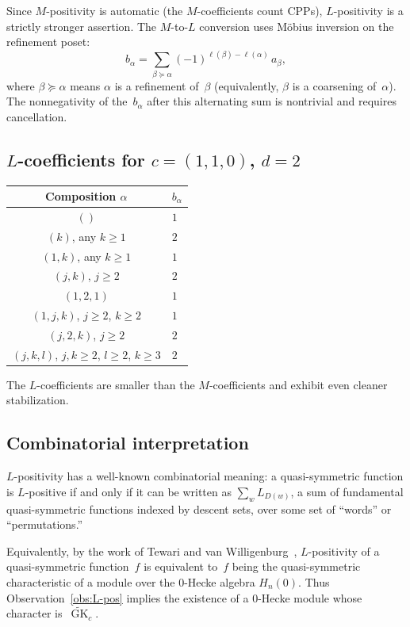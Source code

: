 \documentclass[11pt]{article}
\newcommand{\GK}{\operatorname{GK}}
\begin{document}
Since $M$-positivity is automatic (the $M$-coefficients count
CPPs), $L$-positivity is a strictly stronger assertion.
The $M$-to-$L$ conversion uses M\"obius inversion on the
refinement poset:
\[
  b_\alpha = \sum_{\beta \succeq \alpha}
  (-1)^{\ell(\beta) - \ell(\alpha)}\, a_\beta,
\]
where $\beta \succeq \alpha$ means $\alpha$ is a refinement of~$\beta$
(equivalently, $\beta$ is a coarsening of~$\alpha$).
The nonnegativity of the~$b_\alpha$ after this alternating sum is
nontrivial and requires cancellation.

\subsection{$L$-coefficients for $c = (1,1,0)$, $d = 2$}

\begin{center}
\begin{tabular}{c|l}
  \textbf{Composition $\alpha$} & \textbf{$b_\alpha$} \\
  \hline
  $()$ & $1$ \\
  $(k)$, any $k \geq 1$ & $2$ \\
  $(1, k)$, any $k \geq 1$ & $1$ \\
  $(j, k)$, $j \geq 2$ & $2$ \\
  $(1, 2, 1)$ & $1$ \\
  $(1, j, k)$, $j \geq 2$, $k \geq 2$ & $1$ \\
  $(j, 2, k)$, $j \geq 2$ & $2$ \\
  $(j, k, l)$, $j,k \geq 2$, $l \geq 2$, $k \geq 3$ & $2$
\end{tabular}
\end{center}

The $L$-coefficients are smaller than the $M$-coefficients and
exhibit even cleaner stabilization.

\subsection{Combinatorial interpretation}

$L$-positivity has a well-known combinatorial meaning:
a quasi-symmetric function is $L$-positive if and only if it
can be written as $\sum_w L_{D(w)}$, a sum of fundamental
quasi-symmetric functions indexed by descent sets, over some
set of ``words'' or ``permutations.''

Equivalently, by the work of Tewari and van
Willigenburg~\cite{tewari-vanwilligenburg}, $L$-positivity
of a quasi-symmetric function~$f$ is equivalent to~$f$
being the quasi-symmetric characteristic of a module
over the $0$-Hecke algebra $H_n(0)$.
Thus Observation~\ref{obs:L-pos} implies the existence
of a $0$-Hecke module whose character
is~$\widetilde{\GK}_c$.
\end{document}
